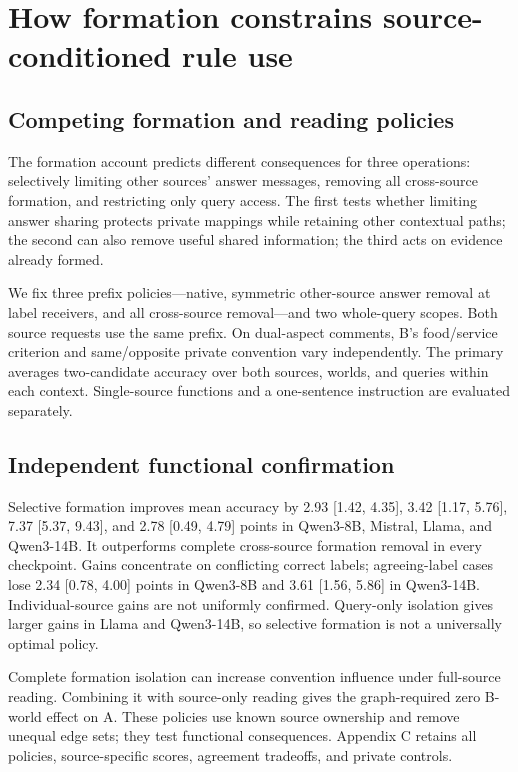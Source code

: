 \documentclass[11pt]{article}
\begin{document}
\section{How formation constrains source-conditioned rule use}\label{how-formation-constrains-source-conditioned-rule-use}

\subsection{Competing formation and reading policies}\label{competing-formation-and-reading-policies}

The formation account predicts different consequences for three operations: selectively limiting other sources' answer messages, removing all cross-source formation, and restricting only query access. The first tests whether limiting answer sharing protects private mappings while retaining other contextual paths; the second can also remove useful shared information; the third acts on evidence already formed.

We fix three prefix policies---native, symmetric other-source answer removal at label receivers, and all cross-source removal---and two whole-query scopes. Both source requests use the same prefix. On dual-aspect comments, B's food/service criterion and same/opposite private convention vary independently. The primary averages two-candidate accuracy over both sources, worlds, and queries within each context. Single-source functions and a one-sentence instruction are evaluated separately.

\subsection{Independent functional confirmation}\label{independent-functional-confirmation}

Selective formation improves mean accuracy by 2.93 {[}1.42, 4.35{]}, 3.42 {[}1.17, 5.76{]}, 7.37 {[}5.37, 9.43{]}, and 2.78 {[}0.49, 4.79{]} points in Qwen3-8B, Mistral, Llama, and Qwen3-14B. It outperforms complete cross-source formation removal in every checkpoint. Gains concentrate on conflicting correct labels; agreeing-label cases lose 2.34 {[}0.78, 4.00{]} points in Qwen3-8B and 3.61 {[}1.56, 5.86{]} in Qwen3-14B. Individual-source gains are not uniformly confirmed. Query-only isolation gives larger gains in Llama and Qwen3-14B, so selective formation is not a universally optimal policy.

Complete formation isolation can increase convention influence under full-source reading. Combining it with source-only reading gives the graph-required zero B-world effect on A. These policies use known source ownership and remove unequal edge sets; they test functional consequences. Appendix C retains all policies, source-specific scores, agreement tradeoffs, and private controls.
\end{document}
